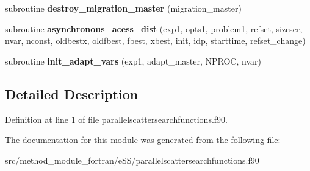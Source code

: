 \begin{DoxyCompactItemize}
\item 
\hypertarget{classparallelscattersearchfunctions_ae7e6dfd64d8e271a0892afc51ef01b13}{subroutine {\bfseries destroy\-\_\-migration\-\_\-master} (migration\-\_\-master)}\label{classparallelscattersearchfunctions_ae7e6dfd64d8e271a0892afc51ef01b13}

\item 
\hypertarget{classparallelscattersearchfunctions_afdfc0d7e724bbbb3cc88a366465726fc}{subroutine {\bfseries asynchronous\-\_\-acess\-\_\-dist} (exp1, opts1, problem1, refset, sizeser, nvar, nconst, oldbestx, oldfbest, fbest, xbest, init, idp, starttime, refset\-\_\-change)}\label{classparallelscattersearchfunctions_afdfc0d7e724bbbb3cc88a366465726fc}

\item 
\hypertarget{classparallelscattersearchfunctions_ab152ced959323148911bbd10e250ab98}{subroutine {\bfseries init\-\_\-adapt\-\_\-vars} (exp1, adapt\-\_\-master, N\-P\-R\-O\-C, nvar)}\label{classparallelscattersearchfunctions_ab152ced959323148911bbd10e250ab98}

\end{DoxyCompactItemize}


\subsection{Detailed Description}


Definition at line 1 of file parallelscattersearchfunctions.\-f90.



The documentation for this module was generated from the following file\-:\begin{DoxyCompactItemize}
\item 
src/method\-\_\-module\-\_\-fortran/e\-S\-S/parallelscattersearchfunctions.\-f90\end{DoxyCompactItemize}
